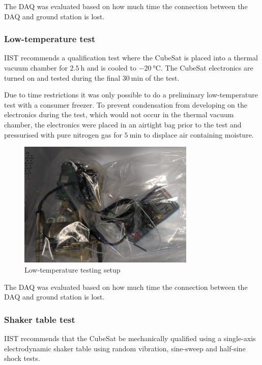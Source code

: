 \documentclass[a4paper,11pt]{article}
\begin{document}
The DAQ was evaluated based on how much time the connection between the DAQ and ground station is lost.

\subsubsection{Low-temperature test}
\label{sec:ltemp-test-framework}
IIST recommends a qualification test where the CubeSat is placed into a thermal vacuum chamber for $\SI{2.5}{\hour}$ and is cooled to $\SI{-20}{\degreeCelsius}$. The CubeSat electronics are turned on and tested during the final $\SI{30}{\minute}$ of the test.

Due to time restrictions it was only possible to do a preliminary low-temperature test with a consumer freezer. To prevent condensation from developing on the electronics during the test, which would not occur in the thermal vacuum chamber, the electronics were placed in an airtight bag prior to the test and pressurised with pure nitrogen gas for $\SI{5}{\minute}$ to displace air containing moisture.

\begin{figure}[H]
  \centering
  \includegraphics[width=0.75\textwidth]{images/fridge_test.jpg}
  \caption{Low-temperature testing setup}
  \label{fig:temperature-testing-fridge}
\end{figure}

The DAQ was evaluated based on how much time the connection between the DAQ and ground station is lost.

\subsubsection{Shaker table test}  \label{sec:shaker-table-test}

IIST recommends that the CubeSat be mechanically qualified using a single-axis electrodynamic shaker table using random vibration, sine-sweep and half-sine shock tests.
\end{document}
